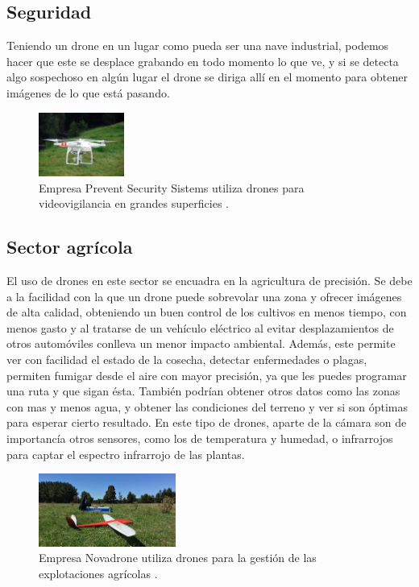 \subsection{Seguridad} 
\hspace{1 cm}Teniendo un drone en un lugar como pueda ser una nave industrial, podemos hacer que este se desplace grabando en todo momento lo que ve, y si se detecta algo sospechoso en alg\'un lugar el drone se diriga all\'i en el momento para obtener im\'agenes de lo que est\'a pasando. 

\begin{figure}[H]
	\centering
		\includegraphics[width=0.25\textwidth]{imgs/seguridad_drone.jpg}
		\caption{Empresa Prevent Security Sistems utiliza drones para videovigilancia en grandes superficies .}
	\label{fig: Empresa Prevent Security Sistems realiza videovigilancia con drones.}
\end{figure}

	\subsection{Sector agr\'icola} 
\hspace{1 cm}El uso de drones en este sector se encuadra en la agricultura de precisi\'on. Se debe a la facilidad con la que un drone puede sobrevolar una zona y ofrecer im\'agenes de alta calidad, obteniendo un buen control de los cultivos en menos tiempo, con menos gasto y al tratarse de un veh\'iculo el\'ectrico al evitar desplazamientos de otros autom\'oviles conlleva un menor impacto ambiental. Adem\'as, este permite ver con facilidad el estado de la cosecha, detectar enfermedades o plagas, permiten fumigar desde el aire con mayor precisi\'on, ya que les puedes programar una ruta y que sigan \'esta. Tambi\'en podr\'ian obtener otros datos como las zonas con mas y menos agua, y obtener las condiciones del terreno y ver si son \'optimas para esperar cierto resultado. En este tipo de drones, aparte de la c\'amara son de importanc\'ia otros sensores, como los de temperatura y humedad, o infrarrojos para captar el espectro infrarrojo de las plantas. 
	
	
\begin{figure}[H]
	\centering
		\includegraphics[width=0.4\textwidth]{imgs/novadrone.jpg}
		\caption{Empresa Novadrone utiliza drones para la gesti\'on de las explotaciones agr\'icolas .}
	\label{fig: Empresa Novadrone, aplicaciones en agricultura.}
\end{figure}

